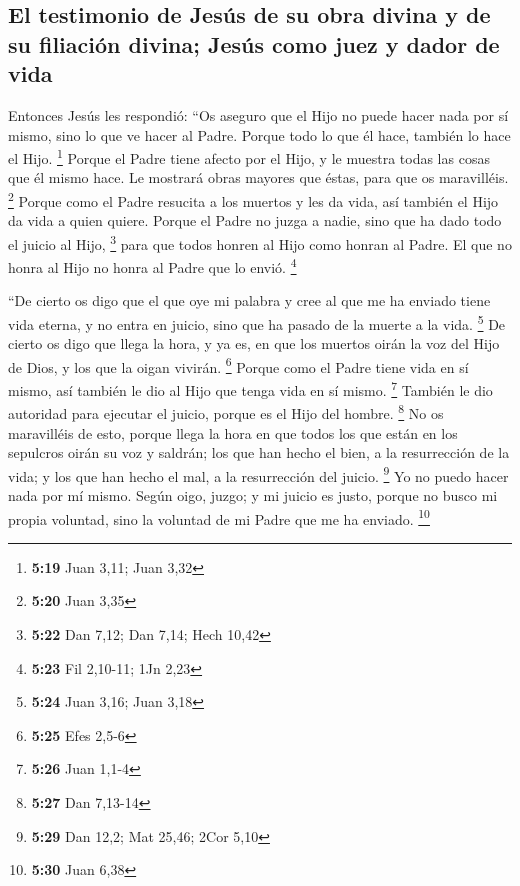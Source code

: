 \begin{paracol}{2}
\hypertarget{el-testimonio-de-jesuxfas-de-su-obra-divina-y-de-su-filiaciuxf3n-divina-jesuxfas-como-juez-y-dador-de-vida}{%
\subsection{El testimonio de Jesús de su obra divina y de su filiación
divina; Jesús como juez y dador de
vida}\label{el-testimonio-de-jesuxfas-de-su-obra-divina-y-de-su-filiaciuxf3n-divina-jesuxfas-como-juez-y-dador-de-vida}}

 Entonces Jesús les respondió: ``Os aseguro que el Hijo
no puede hacer nada por sí mismo, sino lo que ve hacer al Padre. Porque
todo lo que él hace, también lo hace el Hijo. \footnote{\textbf{5:19}
  Juan 3,11; Juan 3,32}  Porque el Padre tiene afecto por
el Hijo, y le muestra todas las cosas que él mismo hace. Le mostrará
obras mayores que éstas, para que os maravilléis. \footnote{\textbf{5:20}
  Juan 3,35}  Porque como el Padre resucita a los muertos
y les da vida, así también el Hijo da vida a quien quiere.
 Porque el Padre no juzga a nadie, sino que ha dado todo
el juicio al Hijo, \footnote{\textbf{5:22} Dan 7,12; Dan 7,14; Hech
  10,42}  para que todos honren al Hijo como honran al
Padre. El que no honra al Hijo no honra al Padre que lo envió.
\footnote{\textbf{5:23} Fil 2,10-11; 1Jn 2,23}

 ``De cierto os digo que el que oye mi palabra y cree al
que me ha enviado tiene vida eterna, y no entra en juicio, sino que ha
pasado de la muerte a la vida. \footnote{\textbf{5:24} Juan 3,16; Juan
  3,18}  De cierto os digo que llega la hora, y ya es, en
que los muertos oirán la voz del Hijo de Dios, y los que la oigan
vivirán. \footnote{\textbf{5:25} Efes 2,5-6}  Porque como
el Padre tiene vida en sí mismo, así también le dio al Hijo que tenga
vida en sí mismo. \footnote{\textbf{5:26} Juan 1,1-4} 
También le dio autoridad para ejecutar el juicio, porque es el Hijo del
hombre. \footnote{\textbf{5:27} Dan 7,13-14}  No os
maravilléis de esto, porque llega la hora en que todos los que están en
los sepulcros oirán su voz  y saldrán; los que han hecho
el bien, a la resurrección de la vida; y los que han hecho el mal, a la
resurrección del juicio. \footnote{\textbf{5:29} Dan 12,2; Mat 25,46;
  2Cor 5,10}  Yo no puedo hacer nada por mí mismo. Según
oigo, juzgo; y mi juicio es justo, porque no busco mi propia voluntad,
sino la voluntad de mi Padre que me ha enviado. \footnote{\textbf{5:30}
  Juan 6,38}


\end{paracol}
